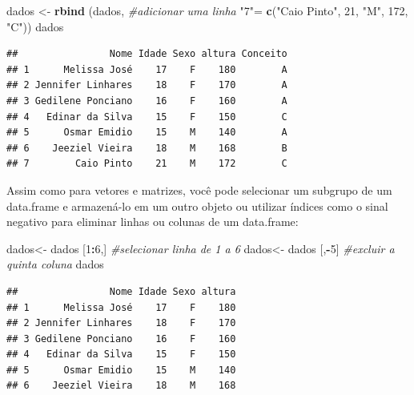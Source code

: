 \documentclass[
]{book}
\newenvironment{Shaded}{\begin{snugshade}}{\end{snugshade}}
\newcommand{\CommentTok}[1]{\textcolor[rgb]{0.56,0.35,0.01}{\textit{#1}}}
\newcommand{\DecValTok}[1]{\textcolor[rgb]{0.00,0.00,0.81}{#1}}
\newcommand{\KeywordTok}[1]{\textcolor[rgb]{0.13,0.29,0.53}{\textbf{#1}}}
\newcommand{\NormalTok}[1]{#1}
\newcommand{\OperatorTok}[1]{\textcolor[rgb]{0.81,0.36,0.00}{\textbf{#1}}}
\newcommand{\StringTok}[1]{\textcolor[rgb]{0.31,0.60,0.02}{#1}}
\begin{document}
\begin{Shaded}
\begin{Highlighting}[]
\NormalTok{dados <-}\StringTok{ }\KeywordTok{rbind}\NormalTok{ (dados, }\CommentTok{#adicionar uma linha}
                \StringTok{"7"}\NormalTok{=}\StringTok{ }\KeywordTok{c}\NormalTok{(}\StringTok{"Caio Pinto"}\NormalTok{, }\DecValTok{21}\NormalTok{, }\StringTok{"M"}\NormalTok{, }\DecValTok{172}\NormalTok{, }\StringTok{"C"}\NormalTok{))}
\NormalTok{dados}
\end{Highlighting}
\end{Shaded}

\begin{verbatim}
##                Nome Idade Sexo altura Conceito
## 1      Melissa José    17    F    180        A
## 2 Jennifer Linhares    18    F    170        A
## 3 Gedilene Ponciano    16    F    160        A
## 4   Edinar da Silva    15    F    150        C
## 5      Osmar Emidio    15    M    140        A
## 6    Jeeziel Vieira    18    M    168        B
## 7        Caio Pinto    21    M    172        C
\end{verbatim}

Assim como para vetores e matrizes, você pode selecionar um subgrupo de um data.frame e armazená-lo em um outro objeto ou utilizar índices como o sinal negativo para eliminar linhas ou colunas de um data.frame:

\begin{Shaded}
\begin{Highlighting}[]
\NormalTok{dados<-}\StringTok{ }\NormalTok{dados [}\DecValTok{1}\OperatorTok{:}\DecValTok{6}\NormalTok{,] }\CommentTok{#selecionar linha de 1 a 6}
\NormalTok{dados<-}\StringTok{ }\NormalTok{dados [,}\OperatorTok{-}\DecValTok{5}\NormalTok{] }\CommentTok{#excluir a quinta coluna}
\NormalTok{dados}
\end{Highlighting}
\end{Shaded}

\begin{verbatim}
##                Nome Idade Sexo altura
## 1      Melissa José    17    F    180
## 2 Jennifer Linhares    18    F    170
## 3 Gedilene Ponciano    16    F    160
## 4   Edinar da Silva    15    F    150
## 5      Osmar Emidio    15    M    140
## 6    Jeeziel Vieira    18    M    168
\end{verbatim}

\begin{Shaded}
\end{Shaded}
\end{document}
